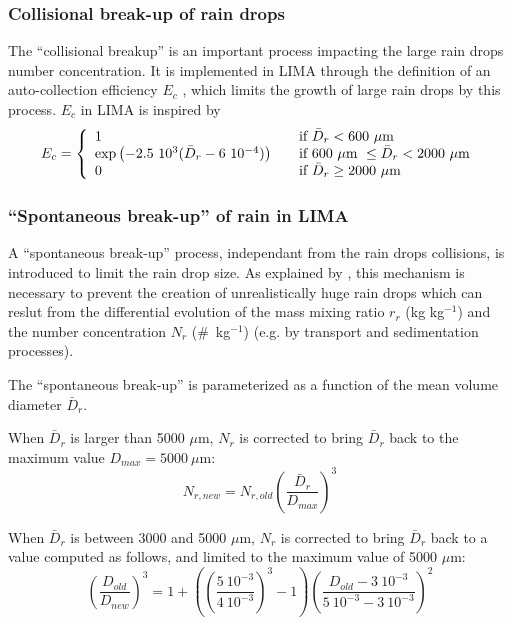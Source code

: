\subsubsection{Collisional break-up of rain drops}

The ``collisional breakup'' is an important process impacting the large rain drops number concentration. It is implemented in LIMA through the definition of an auto-collection efficiency $E_c$ \citep[as introduced by][]{Ziegler1985,Verlinde1990}, which limits the growth of large rain drops by this process. $E_c$ in LIMA is inspired by \citet[][their Eq.\ (4.22)]{Verlinde1993}
\begin{align}
 E_c = \left\{
  \begin{array}{l l}
    1 & \quad \text{if } \bar{D}_r < 600~\mu\text{m} \\
    \exp \left( -2.5~10^3 (\bar{D}_r - 6~10^{-4}) \right) & \quad \text{if } 600~\mu\text{m } \leq \bar{D}_r < 2000~\mu\text{m}\\
    0 & \quad \text{if } \bar{D}_r \ge 2000~\mu\text{m}
  \end{array} \right. 
\end{align}

\subsubsection{``Spontaneous break-up'' of rain in LIMA}

A ``spontaneous break-up'' process, independant from the rain drops collisions, is introduced to limit the rain drop size. As explained by \citet{Cohard2000c2r2test}, this mechanism is necessary to prevent the creation of unrealistically huge rain drops which can reslut from the differential evolution of the mass mixing ratio $r_r$ (kg kg$^{-1}$) and the number concentration $N_r$ ($\#$~kg$^{-1}$) (e.g. by transport and sedimentation processes).

The ``spontaneous break-up'' is parameterized as a function of the mean volume diameter $\bar{D}_r$.

When $\bar{D}_r$ is larger than 5000 $\mu$m, $N_r$ is corrected to bring $\bar{D}_r$ back to the maximum value $D_{max} = 5000~\mu$m:
\begin{equation}
 N_{r,new} = N_{r,old} \left( \frac{\bar{D}_r}{D_{max}} \right)^3
\end{equation}

When $\bar{D}_r$ is between 3000 and 5000 $\mu$m, $N_r$ is corrected to bring $\bar{D}_r$ back to a value computed as follows, and limited to the maximum value of 5000 $\mu$m:
\begin{equation}
 \left(\frac{D_{old}}{D_{new}}\right)^3 = 1 + \left( \left(\frac{5~10^{-3}}{4~10^{-3}}\right)^3 - 1 \right) \left( \frac{D_{old}-3~10^{-3}}{5~10^{-3}-3~10^{-3}} \right)^2
\end{equation}




